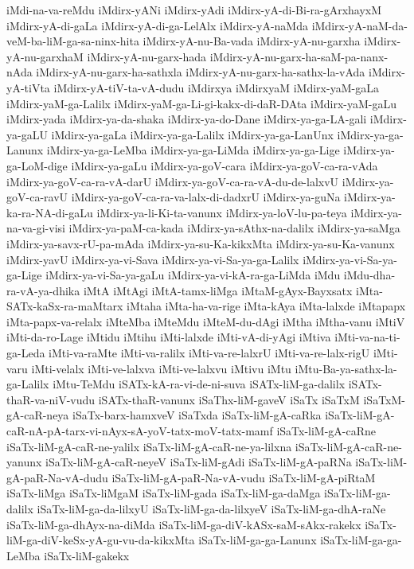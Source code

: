 {iMdi-na-va-reMdu
iMdirx-yANi
iMdirx-yAdi
iMdirx-yA-di-Bi-ra-gArxhayxM
iMdirx-yA-di-gaLa
iMdirx-yA-di-ga-LelAlx
iMdirx-yA-naMda
iMdirx-yA-naM-da-veM-ba-liM-ga-sa-ninx-hita
iMdirx-yA-nu-Ba-vada
iMdirx-yA-nu-garxha
iMdirx-yA-nu-garxhaM
iMdirx-yA-nu-garx-hada
iMdirx-yA-nu-garx-ha-saM-pa-nanx-nAda
iMdirx-yA-nu-garx-ha-sathxla
iMdirx-yA-nu-garx-ha-sathx-la-vAda
iMdirx-yA-tiVta
iMdirx-yA-tiV-ta-vA-dudu
iMdirxya
iMdirxyaM
iMdirx-yaM-gaLa
iMdirx-yaM-ga-Lalilx
iMdirx-yaM-ga-Li-gi-kakx-di-daR-DAta
iMdirx-yaM-gaLu
iMdirx-yada
iMdirx-ya-da-shaka
iMdirx-ya-do-Dane
iMdirx-ya-ga-LA-gali
iMdirx-ya-gaLU
iMdirx-ya-gaLa
iMdirx-ya-ga-Lalilx
iMdirx-ya-ga-LanUnx
iMdirx-ya-ga-Lanunx
iMdirx-ya-ga-LeMba
iMdirx-ya-ga-LiMda
iMdirx-ya-ga-Lige
iMdirx-ya-ga-LoM-dige
iMdirx-ya-gaLu
iMdirx-ya-goV-cara
iMdirx-ya-goV-ca-ra-vAda
iMdirx-ya-goV-ca-ra-vA-darU
iMdirx-ya-goV-ca-ra-vA-du-de-lalxvU
iMdirx-ya-goV-ca-ravU
iMdirx-ya-goV-ca-ra-va-lalx-di-dadxrU
iMdirx-ya-guNa
iMdirx-ya-ka-ra-NA-di-gaLu
iMdirx-ya-li-Ki-ta-vanunx
iMdirx-ya-loV-lu-pa-teya
iMdirx-ya-na-va-gi-visi
iMdirx-ya-paM-ca-kada
iMdirx-ya-sAthx-na-dalilx
iMdirx-ya-saMga
iMdirx-ya-savx-rU-pa-mAda
iMdirx-ya-su-Ka-kikxMta
iMdirx-ya-su-Ka-vanunx
iMdirx-yavU
iMdirx-ya-vi-Sava
iMdirx-ya-vi-Sa-ya-ga-Lalilx
iMdirx-ya-vi-Sa-ya-ga-Lige
iMdirx-ya-vi-Sa-ya-gaLu
iMdirx-ya-vi-kA-ra-ga-LiMda
iMdu
iMdu-dha-ra-vA-ya-dhika
iMtA
iMtAgi
iMtA-tamx-liMga
iMtaM-gAyx-Bayxsatx
iMta-SATx-kaSx-ra-maMtarx
iMtaha
iMta-ha-va-rige
iMta-kAya
iMta-lalxde
iMtapapx
iMta-papx-va-relalx
iMteMba
iMteMdu
iMteM-du-dAgi
iMtha
iMtha-vanu
iMtiV
iMti-da-ro-Lage
iMtidu
iMtihu
iMti-lalxde
iMti-vA-di-yAgi
iMtiva
iMti-va-na-ti-ga-Leda
iMti-va-raMte
iMti-va-ralilx
iMti-va-re-lalxrU
iMti-va-re-lalx-rigU
iMti-varu
iMti-velalx
iMti-ve-lalxva
iMti-ve-lalxvu
iMtivu
iMtu
iMtu-Ba-ya-sathx-la-ga-Lalilx
iMtu-TeMdu
iSATx-kA-ra-vi-de-ni-suva
iSATx-liM-ga-dalilx
iSATx-thaR-va-niV-vudu
iSATx-thaR-vanunx
iSaThx-liM-gaveV
iSaTx
iSaTxM
iSaTxM-gA-caR-neya
iSaTx-barx-hamxveV
iSaTxda
iSaTx-liM-gA-caRka
iSaTx-liM-gA-caR-nA-pA-tarx-vi-nAyx-sA-yoV-tatx-moV-tatx-mamf
iSaTx-liM-gA-caRne
iSaTx-liM-gA-caR-ne-yalilx
iSaTx-liM-gA-caR-ne-ya-lilxna
iSaTx-liM-gA-caR-ne-yanunx
iSaTx-liM-gA-caR-neyeV
iSaTx-liM-gAdi
iSaTx-liM-gA-paRNa
iSaTx-liM-gA-paR-Na-vA-dudu
iSaTx-liM-gA-paR-Na-vA-vudu
iSaTx-liM-gA-piRtaM
iSaTx-liMga
iSaTx-liMgaM
iSaTx-liM-gada
iSaTx-liM-ga-daMga
iSaTx-liM-ga-dalilx
iSaTx-liM-ga-da-lilxyU
iSaTx-liM-ga-da-lilxyeV
iSaTx-liM-ga-dhA-raNe
iSaTx-liM-ga-dhAyx-na-diMda
iSaTx-liM-ga-diV-kASx-saM-sAkx-rakekx
iSaTx-liM-ga-diV-keSx-yA-gu-vu-da-kikxMta
iSaTx-liM-ga-ga-Lanunx
iSaTx-liM-ga-ga-LeMba
iSaTx-liM-gakekx
}
